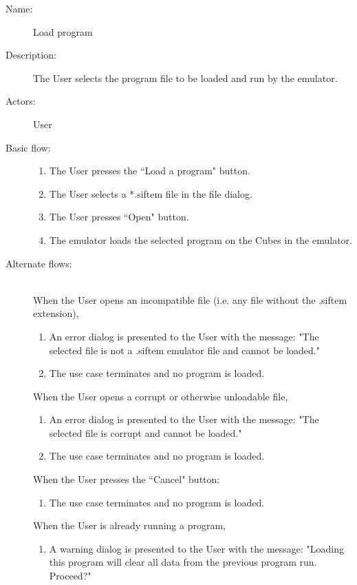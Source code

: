 \documentclass[12pt]{article}
\begin{document}
    \begin{description}
      \item[Name:] Load program
      \item[Description:] The User selects the program file to be loaded and run by the emulator.
      \item[Actors:] User
      \item[Basic flow:] \hfill 
        \begin{enumerate}
	  \item{The User presses the ``Load a program" button.}
	  \item{The User selects a *.siftem file in the file dialog.}
	  \item{The User presses ``Open" button.}
	  \item{The emulator loads the selected program on the Cubes in the emulator.}
        \end{enumerate}
      \item[Alternate flows:] \hfill \\
	When the User opens an incompatible file (i.e. any file without the .siftem extension),
        \begin{enumerate}
			\item{An error dialog is presented to the User with the message: "The selected file is not a .siftem emulator file and cannot be loaded."}
			\item{The use case terminates and no program is loaded.}
        \end{enumerate}
	When the User opens a corrupt or otherwise unloadable file,
        \begin{enumerate}
			\item{An error dialog is presented to the User with the message: "The selected file is corrupt and cannot be loaded."}
			\item{The use case terminates and no program is loaded.}
        \end{enumerate}
	When the User presses the ``Cancel" button:
        \begin{enumerate}
			\item{The use case terminates and no program is loaded.}
        \end{enumerate}
	When the User is already running a program,
		\begin{enumerate}
			\item{A warning dialog is presented to the User with the message: "Loading this program will clear all data from the previous program run. Proceed?"}

\end{enumerate}
\end{description}
\end{document}
